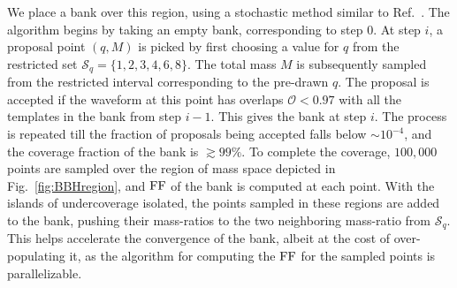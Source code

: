 We place a bank over this region, using a stochastic method similar 
to Ref.~\citep{Harry:2009ea,Ajith:2012mn,Manca:2009xw}. 
The algorithm begins by taking an empty bank,
corresponding to step $0$. At step $i$, a proposal point $(q,M)$ is picked
by first choosing a value for $q$ from the restricted set
$\mathcal{S}_q=\{1,2,3,4,6,8\}$. The total mass $M$ is subsequently sampled
from the restricted interval corresponding to the pre-drawn $q$. The proposal 
is accepted if the waveform at this point has overlaps $\mathcal{O}< 0.97$ 
with all the templates in the bank from step $i-1$. This gives 
the bank at step $i$. The process is repeated till the fraction of 
proposals being accepted falls below $\sim 10^{-4}$, and the coverage
fraction of the bank is $\gtrsim 99\%$.
To complete the coverage, $100,000$ points are sampled over the region of mass
space depicted in Fig.~\ref{fig:BBHregion}, and $\mathrm{FF}$ of the bank
is computed at each point. With the islands of undercoverage isolated, the points
sampled in these regions are added to the bank, pushing their mass-ratios to 
the two neighboring mass-ratio from $\mathcal{S}_q$. 
This helps accelerate the convergence of the bank, albeit at the cost of 
over-populating it, as the algorithm for computing the $\mathrm{FF}$ for the 
sampled points is parallelizable.
